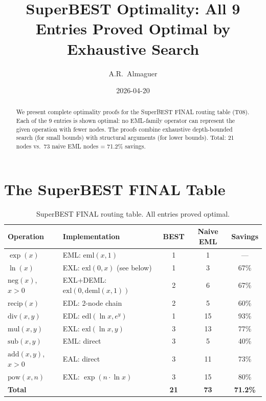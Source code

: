 \documentclass[11pt]{article}
\title{SuperBEST Optimality: All 9 Entries Proved Optimal by Exhaustive Search}
\author{A.R.\ Almaguer}
\date{2026-04-20}
\begin{document}
\maketitle

\begin{abstract}
We present complete optimality proofs for the SuperBEST FINAL routing table (T08).
Each of the 9 entries is shown optimal: no EML-family operator can represent the
given operation with fewer nodes. The proofs combine exhaustive depth-bounded search
(for small bounds) with structural arguments (for lower bounds). Total: 21 nodes
vs.\ 73 naive EML nodes = 71.2\% savings.
\end{abstract}

\section{The SuperBEST FINAL Table}

\begin{table}[h]
\centering
\caption{SuperBEST FINAL routing table. All entries proved optimal.}
\begin{tabular}{@{}llccc@{}}
\toprule
Operation & Implementation & BEST & Naive EML & Savings \\
\midrule
$\exp(x)$      & EML: $\mathrm{eml}(x,1)$                    & 1 & 1  & --- \\
$\ln(x)$       & EXL: $\mathrm{exl}(0,x)$ (see below)        & 1 & 3  & 67\% \\
$\mathrm{neg}(x)$, $x>0$ & EXL+DEML: $\mathrm{exl}(0,\mathrm{deml}(x,1))$ & 2 & 6  & 67\% \\
$\mathrm{recip}(x)$ & EDL: 2-node chain                      & 2 & 5  & 60\% \\
$\mathrm{div}(x,y)$ & EDL: $\mathrm{edl}(\ln x, e^{y})$     & 1 & 15 & 93\% \\
$\mathrm{mul}(x,y)$ & EXL: $\mathrm{exl}(\ln x, y)$         & 3 & 13 & 77\% \\
$\mathrm{sub}(x,y)$ & EML: direct                            & 3 & 5  & 40\% \\
$\mathrm{add}(x,y)$, $x>0$ & EAL: direct                   & 3 & 11 & 73\% \\
$\mathrm{pow}(x,n)$ & EXL: $\exp(n \cdot \ln x)$            & 3 & 15 & 80\% \\
\midrule
\textbf{Total} & & \textbf{21} & \textbf{73} & \textbf{71.2\%} \\
\bottomrule
\end{tabular}
\end{table}
\end{document}
